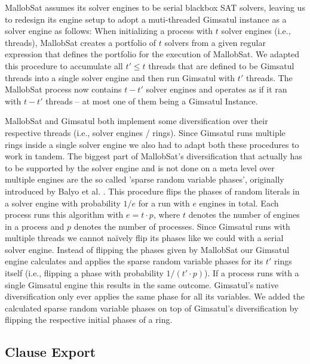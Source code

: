 \documentclass[12pt,a4paper,twoside]{scrartcl}
\numberwithin{equation}{section}
\begin{document}
MallobSat assumes its solver engines to be serial blackbox SAT solvers, leaving us to redesign its engine setup to adopt a muti-threaded Gimsatul instance as a solver engine as follows: 
When initializing a process with $t$ solver engines (i.e., threads), MallobSat creates a portfolio of $t$ solvers from a given regular expression that defines the portfolio for the execution of MallobSat. We adapted this procedure to accumulate all $t' \leq t$ threads that are defined to be Gimsatul threads into a single solver engine and then run Gimsatul with $t'$ threads. The MallobSat process now contains $t - t'$ solver engines and operates as if it ran with $t - t'$ threads -- at most one of them being a Gimsatul Instance.

MallobSat and Gimsatul both implement some diversification over their respective threads (i.e., solver engines / rings). Since Gimsatul runs multiple rings inside a single solver engine we also had to adapt both these procedures to work in tandem.
The biggest part of MallobSat's diversification that actually has to be supported by the solver engine and is not done on a meta level over multiple engines are the so called 'sparse random variable phases', originally introduced by Balyo et al. \cite{hordeSat}. This procedure flips the phases of random literals in a solver engine with probability $1 / e$ for a run with $e$ engines in total. Each process runs this algorithm with $e = t \cdot p$, where $t$ denotes the number of engines in a process and $p$ denotes the number of processes. Since Gimsatul runs with multiple threads we cannot na\"ively flip its phases like we could with a serial solver engine. Instead of flipping the phases given by MallobSat our Gimsatul engine calculates and applies the sparse random variable phases for its $t'$ rings itself (i.e., flipping a phase with probability $1 / (t' \cdot p)$). If a process runs with a single Gimsatul engine this results in the same outcome.
Gimsatul's native diversification only ever applies the same phase for all its variables. We added the calculated sparse random variable phases on top of Gimsatul's diversification by flipping the respective initial phases of a ring.

\subsection{Clause Export}
\end{document}
